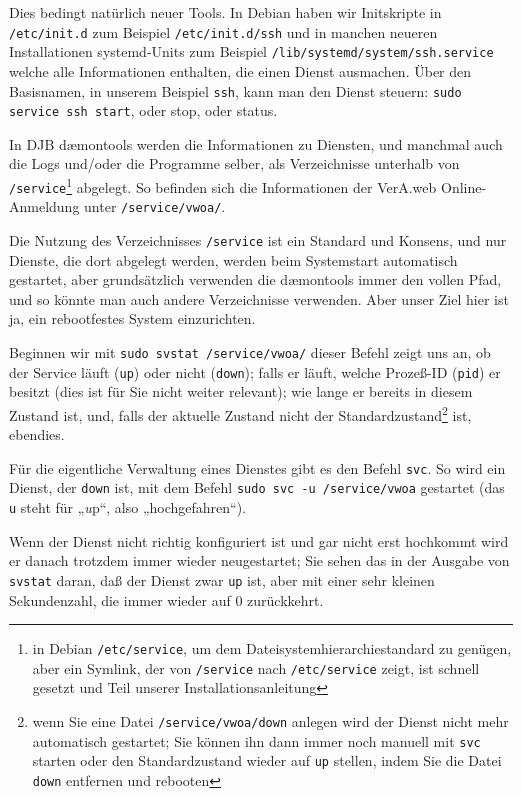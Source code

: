 Dies bedingt natürlich neuer Tools. In Debian haben wir Initskripte in
\texttt{/etc/init.d} \dash zum Beispiel \texttt{/etc/init.d/ssh} \dash
und in manchen neueren Installationen systemd-Units \dash zum Beispiel
\texttt{/lib/systemd/system/ssh.service} \dash welche alle Informationen
enthalten, die einen Dienst ausmachen. Über den Basisnamen, in unserem
Beispiel \texttt{ssh}, kann man den Dienst steuern: \texttt{sudo service
ssh start}, oder stop, oder status.

In DJB dæmontools werden die Informationen zu Diensten, und manchmal auch
die Logs und/oder die Programme selber, als Verzeichnisse unterhalb von
\texttt{/service}\Hair\footnote{in Debian \texttt{/etc/service}, um dem
Dateisystemhierarchiestandard zu genügen, aber ein Symlink, der von
\texttt{/service} nach \texttt{/etc/service} zeigt, ist schnell gesetzt
und Teil unserer Installationsanleitung} abgelegt. So befinden sich die
Informationen der VerA.web Online-Anmeldung unter \texttt{/service/vwoa/}.

Die Nutzung des Verzeichnisses \texttt{/service} ist ein Standard und
Konsens, und nur Dienste, die dort abgelegt werden, werden beim Systemstart
automatisch gestartet, aber grundsätzlich verwenden die dæmontools immer
den vollen Pfad, und so könnte man auch andere Verzeichnisse verwenden.
Aber unser Ziel hier ist ja, ein rebootfestes System einzurichten.

Beginnen wir mit \texttt{sudo svstat /service/vwoa/} \dash dieser Befehl
zeigt uns an, ob der Service läuft (\texttt{up}) oder nicht (\texttt{down});
falls er läuft, welche Prozeß-ID (\texttt{pid}) er besitzt (dies ist für
Sie nicht weiter relevant); wie lange er bereits in diesem Zustand ist,
und, falls der aktuelle Zustand nicht der Standardzustand\Hair\footnote
{wenn Sie eine Datei \texttt{/service/vwoa/down} anlegen wird der Dienst
nicht mehr automatisch gestartet; Sie können ihn dann immer noch manuell
mit \texttt{svc} starten oder den Standardzustand wieder auf \texttt{up}
stellen, indem Sie die Datei \texttt{down} entfernen und rebooten} ist,
ebendies.

Für die eigentliche Verwaltung eines Dienstes gibt es den Befehl
\texttt{svc}. So wird ein Dienst, der \texttt{down} ist, mit dem Befehl
\texttt{sudo svc -u /service/vwoa} gestartet (das \texttt{u} steht für
„\emph{u}p“, also „hochgefahren“).

Wenn der Dienst nicht richtig konfiguriert ist und gar nicht erst hochkommt
wird er danach trotzdem immer wieder neugestartet; Sie sehen das in der
Ausgabe von \texttt{svstat} daran, daß der Dienst zwar \texttt{up} ist,
aber mit einer sehr kleinen Sekundenzahl, die immer wieder auf 0 zurückkehrt.

